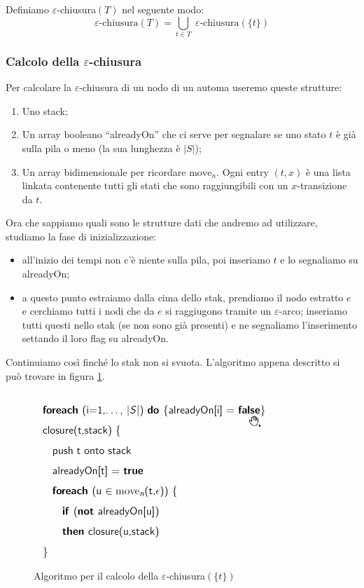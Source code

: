 \documentclass[class=book, crop=false, oneside, 12pt]{standalone}
\begin{document}
Definiamo \(\varepsilon\)-chiusura\((T)\) nel seguente modo:
\begin{equation}
    \varepsilon \textrm{-chiusura}(T) = \bigcup_{t \in T} \;\varepsilon\textrm{-chiusura}(\{t\})
\end{equation} 

\subsubsection{Calcolo della \(\varepsilon\)-chiusura}
Per calcolare la \(\varepsilon\)-chiusura di un nodo di un automa useremo queste strutture:

\begin{enumerate}
    \item Uno stack;
    \item Un array booleano “alreadyOn” che ci serve per segnalare se uno stato \(t\) è già sulla pila o meno (la sua lunghezza è \(|S|\));
    \item Un array bidimensionale per ricordare \(\textrm{move}_n\). Ogni entry \((t,x)\) è una lista linkata contenente tutti gli stati che sono raggiungibili con un \(x\)-transizione da \(t\).
\end{enumerate}

Ora che sappiamo quali sono le strutture dati che andremo ad utilizzare, studiamo la fase di inizializzazione: 

\begin{itemize}
    \item all’inizio dei tempi non c’è niente sulla pila, poi inseriamo \(t\) e lo segnaliamo su alreadyOn;
    \item a questo punto estraiamo dalla cima dello stak, prendiamo il nodo estratto \(e\) e cerchiamo tutti i nodi che da \(e\) si raggiugono tramite un \(\varepsilon\)-arco; inseriamo tutti questi nello stak (se non sono già presenti) e ne segnaliamo l'inserimento settando il loro flag su alreadyOn.
\end{itemize}

Continuiamo così finché lo stak non si svuota. L'algoritmo appena descritto si può trovare in figura \ref{algoritmo_epsilon_chiusura}.

\begin{figure}[H]
    \centering
    \includegraphics[width=.6\textwidth,keepaspectratio]{algoritmo_epsilon_chiusura}
    \caption{Algoritmo per il calcolo della \(\varepsilon\)-chiusura\((\{t\})\)}
    \label{algoritmo_epsilon_chiusura}
\end{figure}
\end{document}
